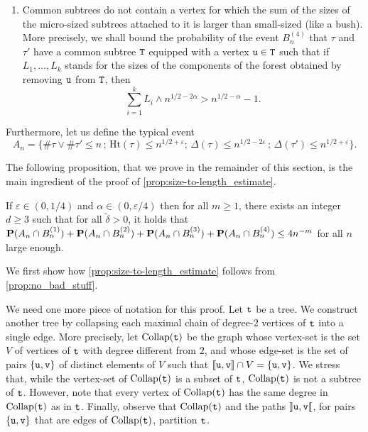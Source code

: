 \documentclass[11pt,reqno]{amsart}
\newcommand{\Ht}{\mathrm{Ht}}
\begin{document}
\begin{enumerate}
    \item[\textbf{Bush.}]  Common subtrees do not contain a vertex for which the sum of the sizes of the micro-sized subtrees attached to it is larger than small-sized (like a bush). More precisely, we shall bound the probability of the event $B_n^{(4)}$ that $\tau$ and $\tau'$ have a common subtree $\ttT$ equipped with a vertex $\ttu\in\ttT$ such that if $L_1,\ldots,L_k$ stands for the sizes of the components of the forest obtained by removing $\ttu$ from $\ttT$, then
    \[\sum_{i=1}^k L_i\wedge n^{1/2-2\alpha}> n^{1/2-\alpha}-1.\]
\end{enumerate}
Furthermore, let us define the typical event \[A_n=\big\{\#\tau\vee\#\tau'\leq n\, ;\, \Ht(\tau)\leq n^{1/2+\varepsilon}  ;\, \Delta(\tau)\leq n^{1/2-2\varepsilon}\, ;\, \Delta(\tau')\leq n^{1/2+\varepsilon}\big\}.\]



The following proposition, that we prove in the remainder of this section, is the main ingredient of the proof of \cref{prop:size-to-length_estimate}. 

\begin{prop}
\label{prop:no_bad_stuff}
If $\varepsilon\in (0,1/4)$ and $\alpha\in (0,\varepsilon/4)$ then for all $m\geq 1$, there exists an integer $d\geq 3$ such that for all $\tilde{\delta}>0$, it holds that $\P(A_n\cap B_n^{(1)})+\P(A_n\cap B_n^{(2)})+\P(A_n\cap B_n^{(3)})+\P(A_n\cap B_n^{(4)})\leq 4n^{-m}$ for all $n$ large enough.
\end{prop}


We first show how \cref{prop:size-to-length_estimate} follows from \cref{prop:no_bad_stuff}. 

We need one more piece of notation for this proof. Let $\ttt$ be a tree. We construct another tree by collapsing each maximal chain of degree-$2$ vertices of $\ttt$ into a single edge. More precisely, let $\mathrm{Collap}(\ttt)$ be the graph whose vertex-set is
the set $V$ of vertices of $\ttt$ with degree different from $2$, and whose edge-set is the set of pairs $\{\ttu,\ttv\}$ of distinct elements of $V$ such that $\llbracket\ttu,\ttv\rrbracket\cap V=\{\ttu,\ttv\}$. We stress that, while the vertex-set of $\mathrm{Collap}(\ttt)$ is a subset of $\ttt$, $\mathrm{Collap}(\ttt)$ is not a subtree of $\ttt$. However, note that every vertex of $\mathrm{Collap}(\ttt)$ has the same degree in $\mathrm{Collap}(\ttt)$ as in $\ttt$. Finally, observe that $\mathrm{Collap}(\ttt)$ and the paths $\rrbracket\ttu,\ttv\llbracket$, for pairs $\{\ttu,\ttv\}$ that are edges of $\mathrm{Collap}(\ttt)$, partition $\ttt$. 
\end{document}
